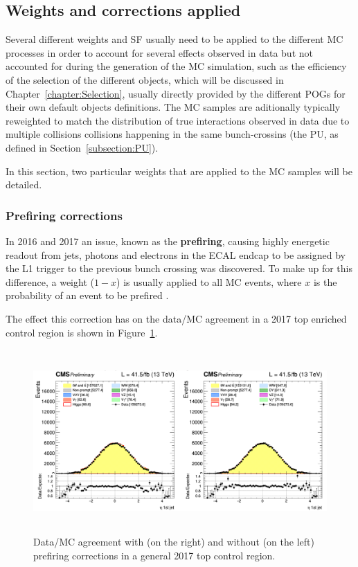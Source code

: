 \documentclass[a4paper, 10pt, openright]{report}
\begin{document}
\subsection{Weights and corrections applied} \label{subsection:Weights}

Several different weights and \acf{SF} usually need to be applied to the different \ac{MC} processes in order to account for several effects observed in data but not accounted for during the generation of the \ac{MC} simulation, such as the efficiency of the selection of the different objects, which will be discussed in Chapter~\ref{chapter:Selection}, usually directly provided by the different \acfp{POG} for their own default objects definitions.  The \ac{MC} samples are aditionally typically reweighted to match the distribution of true interactions observed in data due to multiple collisions collisions happening in the same bunch-crossins (the \ac{PU}, as defined in Section~\ref{subsection:PU}).

In this section, two particular weights that are applied to the \ac{MC} samples will be detailed.	

\subsubsection{Prefiring corrections}

In 2016 and 2017 an issue, known as the \textbf{prefiring}, causing highly energetic readout from jets, photons and electrons in the \ac{ECAL} endcap to be assigned by the \ac{L1} trigger to the previous bunch crossing was discovered. To make up for this difference, a weight ($1-x$) is usually applied to all \ac{MC} events, where $x$ is the probability of an event to be prefired \cite{Prefire}. 

The effect this correction has on the data/\ac{MC} agreement in a 2017 top enriched control region is shown in Figure~\ref{fig:Prefiring}.

\begin{figure}[htbp]
\begin{center}
\includegraphics[width=14cm, height=7cm]{figs/Prefiring.png}
\caption{Data/\ac{MC} agreement with (on the right) and without (on the left) prefiring corrections in a general 2017 top control region.}
\label{fig:Prefiring}
\end{center}
\end{figure}
\end{document}
